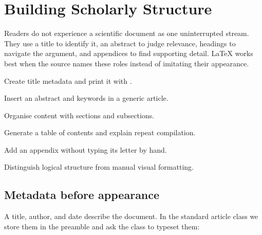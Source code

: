 \chapter{Building Scholarly Structure}
\label{chap:structure}

Readers do not experience a scientific document as one uninterrupted stream.
They use a title to identify it, an abstract to judge relevance, headings to
navigate the argument, and appendices to find supporting detail. \LaTeX{} works
best when the source names these roles instead of imitating their appearance.

\begin{learningoutcomes}
  \item Create title metadata and print it with .
  \item Insert an abstract and keywords in a generic article.
  \item Organise content with sections and subsections.
  \item Generate a table of contents and explain repeat compilation.
  \item Add an appendix without typing its letter by hand.
  \item Distinguish logical structure from manual visual formatting.
\end{learningoutcomes}

\section{Metadata before appearance}

A title, author, and date describe the document. In the standard article class
we store them in the preamble and ask the class to typeset them:


\sourceanatomy

